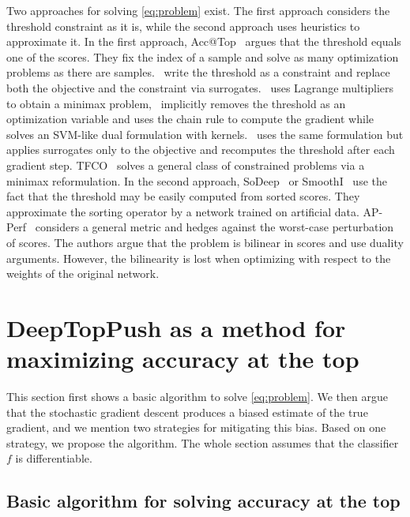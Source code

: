 Two approaches for solving \eqref{eq:problem} exist. The first approach considers the threshold constraint as it is, while the second approach uses heuristics to approximate it. In the first approach, Acc@Top~\cite{boyd2012accuracy} argues that the threshold equals one of the scores. They fix the index of a sample and solve as many optimization problems as there are samples.~\cite{eban2017scalable,adam2019patmat,kumar2021implicit} write the threshold as a constraint and replace both the objective and the constraint via surrogates.~\cite{eban2017scalable} uses Lagrange multipliers to obtain a minimax problem,~\cite{mackey2018constrained} implicitly removes the threshold as an optimization variable and uses the chain rule to compute the gradient while~\cite{macha2020nonlinear} solves an SVM-like dual formulation with kernels.~\cite{grill2016learning} uses the same formulation but applies surrogates only to the objective and recomputes the threshold after each gradient step. TFCO~\cite{cotter2019optimization} solves a general class of constrained problems via a minimax reformulation. In the second approach, SoDeep~\cite{engilberge2019sodeep} or SmoothI~\cite{thonet2021smoothi} use the fact that the threshold may be easily computed from sorted scores. They approximate the sorting operator by a network trained on artificial data. AP-Perf~\cite{fathony2019ap} considers a general metric and hedges against the worst-case perturbation of scores. The authors argue that the problem is bilinear in scores and use duality arguments. However, the bilinearity is lost when optimizing with respect to the weights of the original network. 

\section{DeepTopPush as a method for maximizing accuracy at the top}\label{sec:solving}

This section first shows a basic algorithm to solve \eqref{eq:problem}. We then argue that the stochastic gradient descent produces a biased estimate of the true gradient, and we mention two strategies for mitigating this bias. Based on one strategy, we propose the \DeepTopPush algorithm. The whole section assumes that the classifier~$f$ is differentiable.

\subsection{Basic algorithm for solving accuracy at the top}

